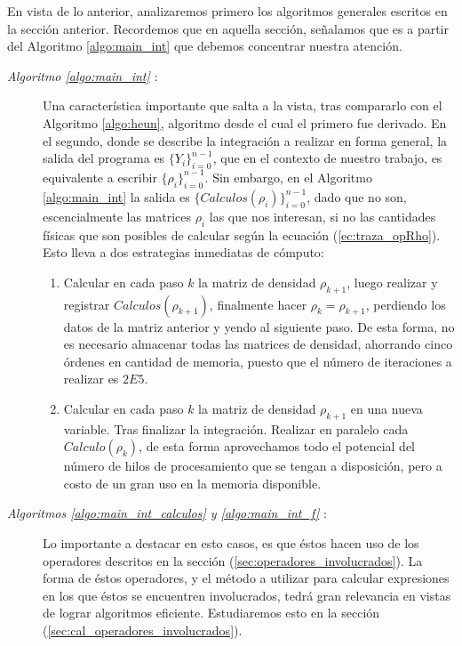 \quad En vista de lo anterior, analizaremos primero los algoritmos generales escritos en la secci\'on anterior. Recordemos que en aquella secci\'on, se\~nalamos que es a partir del Algoritmo \ref{algo:main_int} que debemos concentrar nuestra atenci\'on.

\begin{description}

 \item[\emph{Algoritmo \ref{algo:main_int}} :] Una caracter\'istica importante que salta a la vista, tras compararlo con el Algoritmo \ref{algo:heun}, algoritmo desde el cual el primero fue derivado. En el segundo, donde se describe la integraci\'on a realizar en forma general, la salida del programa es $\{Y_i\}_{i=0}^{n-1}$, que en el contexto de nuestro trabajo, es equivalente a escribir $\{\rho_i\}_{i=0}^{n-1}$. Sin embargo, en el Algoritmo \ref{algo:main_int} la salida es $\{Calculos(\rho_i)\}_{i=0}^{n-1}$, dado que no son, escencialmente las matrices $\rho_i$ las que nos interesan, si no las cantidades f\'isicas que son posibles de calcular seg\'un la ecuaci\'on (\ref{ec:traza_opRho}). Esto lleva a dos estrategias inmediatas de c\'omputo:

\begin{enumerate}
 \item Calcular en cada paso $k$ la matriz de densidad $\rho_{k+1}$, luego realizar y registrar $Calculos(\rho_{k+1})$, finalmente hacer $\rho_k=\rho_{k+1}$, perdiendo los datos de la matriz anterior y yendo al siguiente paso. De esta forma, no es necesario almacenar todas las matrices de densidad, ahorrando cinco \'ordenes en cantidad de memoria, puesto que el n\'umero de iteraciones a realizar es $2E5$.
\item Calcular en cada paso $k$ la matriz de densidad $\rho_{k+1}$ en una nueva variable. Tras finalizar la integraci\'on. Realizar en paralelo cada $Calculo(\rho_k)$, de esta forma aprovechamos todo el potencial del n\'umero de hilos de procesamiento que se tengan a disposici\'on, pero a costo de un gran uso en la memoria disponible. 
\end{enumerate}

\item[\emph{Algoritmos \ref{algo:main_int_calculos} y \ref{algo:main_int_f}} :] Lo importante a destacar en esto casos, es que \'estos hacen uso de los operadores descritos en la secci\'on (\ref{sec:operadores_involucrados}). La forma de \'estos operadores, y el m\'etodo a utilizar para calcular expresiones en los que \'estos se encuentren involucrados, tedr\'a gran relevancia en vistas de lograr algoritmos eficiente. Estudiaremos esto en la secci\'on (\ref{sec:cal_operadores_involucrados}).


\end{description}
